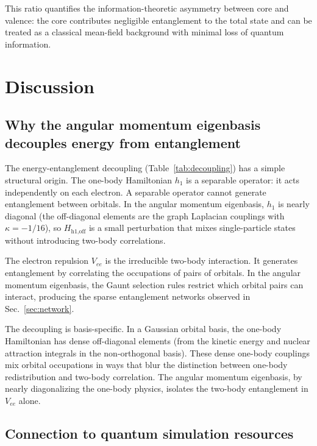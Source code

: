 \documentclass[twocolumn,pra,amsmath,amssymb,superscriptaddress]{revtex4-2}
\begin{document}
This ratio quantifies the information-theoretic asymmetry between
core and valence: the core contributes negligible entanglement to
the total state and can be treated as a classical mean-field
background with minimal loss of quantum information.

\section{Discussion}
\label{sec:discussion}

\subsection{Why the angular momentum eigenbasis decouples energy
from entanglement}

The energy-entanglement decoupling (Table~\ref{tab:decoupling})
has a simple structural origin.  The one-body Hamiltonian $h_1$
is a separable operator: it acts independently on each electron.
A separable operator cannot generate entanglement between orbitals.
In the angular momentum eigenbasis, $h_1$ is nearly diagonal (the
off-diagonal elements are the graph Laplacian couplings with
$\kappa = -1/16$), so $H_{\text{h1,off}}$ is a small perturbation
that mixes single-particle states without introducing two-body
correlations.

The electron repulsion $V_{ee}$ is the irreducible two-body
interaction.  It generates entanglement by correlating the
occupations of pairs of orbitals.  In the angular momentum
eigenbasis, the Gaunt selection rules restrict which orbital pairs
can interact, producing the sparse entanglement networks observed
in Sec.~\ref{sec:network}.

The decoupling is basis-specific.  In a Gaussian orbital basis,
the one-body Hamiltonian has dense off-diagonal elements (from
the kinetic energy and nuclear attraction integrals in the
non-orthogonal basis).  These dense one-body couplings mix orbital
occupations in ways that blur the distinction between one-body
redistribution and two-body correlation.  The angular momentum
eigenbasis, by nearly diagonalizing the one-body physics, isolates
the two-body entanglement in $V_{ee}$ alone.

\subsection{Connection to quantum simulation resources}
\end{document}
